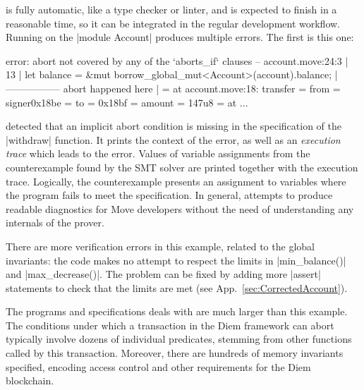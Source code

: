 
\label{sec:RunningProver}

\MVP is fully automatic, like a type checker or linter, and is
expected to finish in a reasonable time, so it can be integrated in
the regular development workflow. Running \MVP on the |module Account| produces
multiple errors. The first is this one:

\begin{MoveDiag}
error: abort not covered by any of the `aborts_if` clauses
   -- account.move:24:3
   |
13 |       let balance = &mut borrow_global_mut<Account>(account).balance;
   |                          ----------------- abort happened here
   |
   =     at account.move:18: transfer
   =         from = signer{0x18be}
   =         to = 0x18bf
   =         amount = 147u8
   =     at ...
\end{MoveDiag}

\noindent \MVP detected that an implicit abort condition is missing in the
specification of the |withdraw| function. It prints the context of the error, as
well as an \emph{execution trace} which leads to the error. Values of variable
assignments from the counterexample found by the SMT solver are printed together
with the execution trace. Logically, the counterexample presents an
assignment to variables where the program fails to meet the specification. In
general, \MVP attempts to produce readable diagnostics for Move developers
without the need of understanding any internals of the prover.

There are more verification errors in this example, related to the global
invariants: the code makes no attempt to respect the limits in |min_balance()|
and |max_decrease()|.  The problem can be fixed by adding more |assert|
statements to check that the limits are met (see
App.~\ref{sec:CorrectedAccount}).


The programs and specifications \MVP deals with are much larger than
this example. The conditions under which a transaction
in the Diem framework can abort typically involve dozens of individual predicates,
stemming from other functions called by this transaction. Moreover, there are
hundreds of memory invariants specified, encoding access control and other
requirements for the Diem blockchain.

